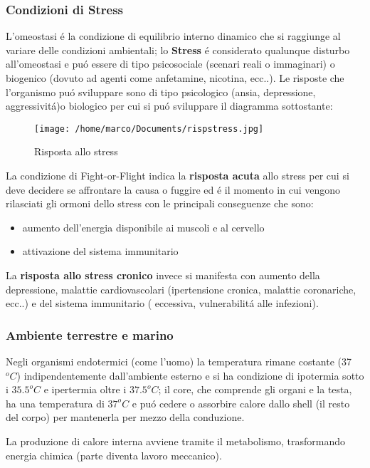\documentclass[10pt]{article}
\begin{document}
\subsubsection{Condizioni di Stress}

L'omeostasi é la condizione di equilibrio interno dinamico che si raggiunge al variare delle condizioni ambientali; lo \textbf{Stress} é considerato qualunque disturbo all'omeostasi e puó essere di tipo psicosociale (scenari reali o immaginari) o biogenico (dovuto ad agenti come anfetamine, nicotina, ecc..). Le risposte che l'organismo puó sviluppare sono di tipo psicologico (ansia, depressione, aggressivitá)o biologico per cui si puó sviluppare il diagramma sottostante:
\begin{figure}[h!]
\centering
\texttt{[image: /home/marco/Documents/rispstress.jpg]}
\caption{Risposta allo stress}
\label{fig:rispstress}
\end{figure}


La condizione di Fight-or-Flight indica la \textbf{risposta acuta} allo stress per cui si deve decidere se affrontare la causa o fuggire ed é il momento in cui vengono rilasciati gli ormoni dello stress con le principali conseguenze che sono:
\begin{itemize}
\item aumento dell'energia disponibile ai muscoli e al cervello 
\item attivazione del sistema immunitario
\end{itemize}

La \textbf{risposta allo stress cronico} invece si manifesta con aumento della depressione, malattie cardiovascolari (ipertensione cronica, malattie coronariche, ecc..) e del sistema immunitario ( eccessiva, vulnerabilitá alle infezioni).

\subsubsection{Ambiente terrestre e marino}

Negli organismi endotermici (come l'uomo) la temperatura rimane costante (37 $^oC$) indipendentemente dall'ambiente esterno e si ha condizione di ipotermia sotto i $35.5 ^oC$
e ipertermia oltre i $37.5 ^oC$; il core, che comprende gli organi e la testa, ha una temperatura di $37 ^oC$ e puó cedere o assorbire calore dallo shell (il resto del corpo) per mantenerla per mezzo della conduzione.


La produzione di calore interna avviene tramite il metabolismo, trasformando energia chimica (parte diventa lavoro meccanico).
\end{document}
